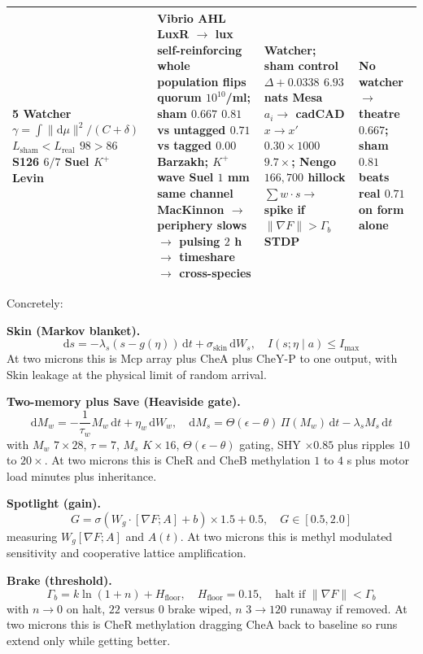 \documentclass[11pt,a4paper]{article}
\begin{document}
\begin{table}[h]
\begin{tabular}{p{3.2cm} p{4.7cm} p{2.8cm} p{3.2cm}}
\midrule
5 Watcher $\gamma = \int \|\mathrm{d}\mu\|^2/(C+\delta)$ $L_{\text{sham}} < L_{\text{real}}$ $98{>}86$ S126 $6/7$ Suel $K^+$ Levin & Vibrio AHL LuxR $\to$ lux self-reinforcing whole population flips quorum $10^{10}$/ml; sham $0.667$ $0.81$ vs untagged $0.71$ vs tagged $0.00$ Barzakh; $K^+$ wave Suel $1$ mm same channel MacKinnon $\to$ periphery slows $\to$ pulsing $2$ h $\to$ timeshare $\to$ cross-species & Watcher; sham control $\Delta +0.0338$ $6.93$ nats Mesa $a_i\to$ cadCAD $x\to x'$ $0.30\times1000$ $9.7\times$; Nengo $166{,}700$ hillock $\sum w\cdot s \to$ spike if $\|\nabla F\|>\Gamma_b$ STDP & No watcher $\to$ theatre $0.667$; sham $0.81$ beats real $0.71$ on form alone \\
\bottomrule
\end{tabular}
\end{table}

Concretely:

\textbf{Skin (Markov blanket).}
\begin{equation}
\mathrm{d}s = -\lambda_s (s - g(\eta))\,\mathrm{d}t + \sigma_{\text{skin}}\,\mathrm{d}W_s,\quad I(s;\eta \mid a) \leq I_{\max}
\end{equation}
At two microns this is Mcp array plus CheA plus CheY-P to one output, with Skin leakage at the physical limit of random arrival.

\textbf{Two-memory plus Save (Heaviside gate).}
\begin{equation}
\mathrm{d}M_w = -\frac{1}{\tau_w} M_w\,\mathrm{d}t + \eta_w\,\mathrm{d}W_w,\quad \mathrm{d}M_s = \Theta(\epsilon - \theta)\, \Pi(M_w)\,\mathrm{d}t - \lambda_s M_s\,\mathrm{d}t
\end{equation}
with $M_w$ $7 \times 28$, $\tau = 7$, $M_s$ $K \times 16$, $\Theta(\epsilon-\theta)$ gating, SHY $\times 0.85$ plus ripples $10$ to $20\times$. At two microns this is CheR and CheB methylation $1$ to $4$ s plus motor load minutes plus inheritance.

\textbf{Spotlight (gain).}
\begin{equation}
G = \sigma(W_g \cdot [\nabla F; A] + b)\times 1.5 + 0.5,\quad G \in [0.5, 2.0]
\end{equation}
measuring $W_g[\nabla F; A]$ and $A(t)$. At two microns this is methyl modulated sensitivity and cooperative lattice amplification.

\textbf{Brake (threshold).}
\begin{equation}
\Gamma_b = k \ln(1+n) + H_{\text{floor}},\quad H_{\text{floor}} = 0.15,\quad \text{halt if } \|\nabla F\| < \Gamma_b
\end{equation}
with $n\to 0$ on halt, $22$ versus $0$ brake wiped, $n$ $3 \to 120$ runaway if removed. At two microns this is CheR methylation dragging CheA back to baseline so runs extend only while getting better.
\end{document}

